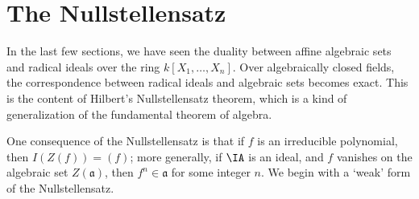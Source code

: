 %
%


\section{The Nullstellensatz}

In the last few sections, we have seen the duality between affine algebraic sets and radical ideals over the ring $k[X_1, \dots, X_n]$. Over algebraically closed fields, the correspondence between radical ideals and algebraic sets becomes exact. This is the content of Hilbert's Nullstellensatz theorem, which is a kind of generalization of the fundamental theorem of algebra.



One consequence of the Nullstellensatz is that if $f$ is an irreducible polynomial, then $I(Z(f)) = (f)$; more generally, if $\IA$ is an ideal, and $f$ vanishes on the algebraic set $Z(\mathfrak{a})$, then $f^n \in \mathfrak{a}$ for some integer $n$. We begin with a `weak' form of the Nullstellensatz.

